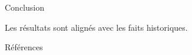 \documentclass[xcolor={table,usenames,dvipsnames}]{beamer}
\let\olditem\item
\renewcommand{\item}{%
\olditem\vspace{0pt}}
\begin{document}
\begin{frame}{Conclusion}
\begin{enumerate}
\begin{alertblock}{\vspace*{-0.6mm}}
	\centering
	Les résultats sont alignés avec les faits historiques.
\end{alertblock}

		
	\end{enumerate}
	

		
	\end{frame}
%
%
%
%
%
%
%




\begin{frame}[allowframebreaks]{Références}
\printbibliography

\end{frame}
\end{document}
